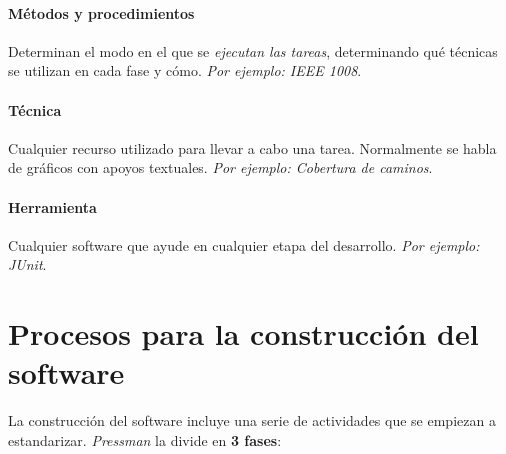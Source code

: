 \paragraph{Métodos y procedimientos} Determinan el modo en el que se \textit{ejecutan las tareas}, determinando qué técnicas se utilizan en cada fase y cómo. \textit{Por ejemplo: IEEE 1008}.

\paragraph{Técnica} Cualquier recurso utilizado para llevar a cabo una tarea. Normalmente se habla de gráficos con apoyos textuales. \textit{Por ejemplo: Cobertura de caminos}.

\paragraph{Herramienta} Cualquier software que ayude en cualquier etapa del desarrollo. \textit{Por ejemplo: JUnit}.


\section{Procesos para la construcción del software}


La construcción del software incluye una serie de actividades que se empiezan a estandarizar. \textit{Pressman} la divide en \textbf{3 fases}:

